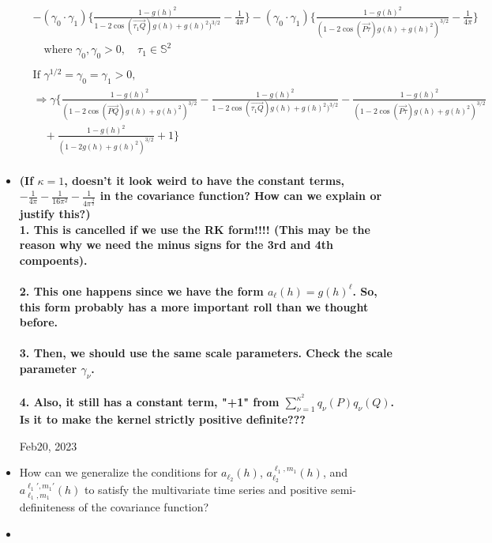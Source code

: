 \documentclass[11pt]{article}
\begin{document}
\begin{itemize}
\begin{align*}
&- (\gamma_0 \cdot \gamma_1) \biggl\{ \frac{1 - g(h)^2}{1-2 \cos{(\overrightarrow{\tau_1 Q})} g(h) + g(h)^2)^{3/2}} - \frac{1}{4\pi} \biggl\} - (\gamma_0 \cdot \gamma_1) \biggl\{ \frac{1 - g(h)^2}{(1-2 \cos{(\overrightarrow{P \tau})} g(h) + g(h)^2)^{3/2}} - \frac{1}{4\pi} \biggl\}\\
&\quad \text{where } \gamma_0, \gamma_{0}>0, \quad \tau_{1} \in \mathbb{S}^2 \\
\\
&\text{If $\gamma^{1/2} = \gamma_0 = \gamma_1 > 0$}, \\
&\Rightarrow \gamma \Biggl\{ \frac{1 - g(h)^2}{(1-2 \cos{(\overrightarrow{PQ})} g(h) + g(h)^2)^{3/2}} - \frac{1 - g(h)^2}{1-2 \cos{(\overrightarrow{\tau_1 Q})} g(h) + g(h)^2)^{3/2}} - \frac{1 - g(h)^2}{(1-2 \cos{(\overrightarrow{P \tau})} g(h) + g(h)^2)^{3/2}}\\
&\quad + \frac{1 - g(h)^2}{(1-2 g(h) + g(h)^2)^{3/2}} + 1 \Biggl\} \\
\end{align*}

\item
\textbf{{\color{red} (If $\kappa=1$, doesn't it look weird to have the constant terms, $-\frac{1}{4\pi} - \frac{1}{16\pi^2} - \frac{1}{4\pi^\frac{3}{2}}$ in the covariance function? How can we explain or justify this?)}}\\ 
\textbf{{\color{blue} 1. This is cancelled if we use the RK form!!!! (This may be the reason why we need the minus signs for the 3rd and 4th compoents).}}\\
\\
\textbf{{\color{blue} 2. This one happens since we have the form $a_\ell(h) = g(h)^\ell$. So, this form probably has a more important roll than we thought before.}}\\ 
\\
\textbf{{\color{blue} 3. Then, we should use the same scale parameters. Check the scale parameter $\gamma_\nu$.}}\\
\\
\textbf{{\color{blue} 4. Also, it still has a constant term, "+1" from $\sum_{\nu=1}^{\kappa^2}q_{\nu}(P) q_{\nu}(Q)$. Is it to make the kernel strictly positive definite???}}\\

\pagebreak

Feb20, 2023\\

\item How can we generalize the conditions for $a_{\ell_2}(h)$, $a_{\ell_2}^{\ell_1,m_1}(h)$, and $a_{\ell_1,m_1}^{\ell_1',m_1'}(h)$ to satisfy the multivariate time series and positive semi-definiteness of the covariance function?\\ 

\item


\end{itemize}
\end{document}
